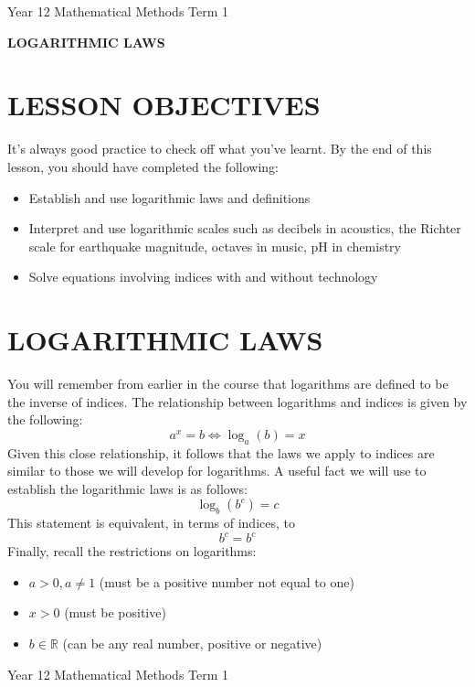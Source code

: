 \documentclass[12pt]{article}
\begin{document}
\noindent Year 12 Mathematical Methods \hfill Term 1
\begin{center}
    \Large\textbf{LOGARITHMIC LAWS}
\end{center}

\section*{LESSON OBJECTIVES}
\noindent It's always good practice to check off what you've learnt. By the end of this lesson, you should have completed the following:
\begin{itemize}
  \item Establish and use logarithmic laws and definitions
  \item Interpret and use logarithmic scales such as decibels in acoustics, the Richter scale for earthquake magnitude, octaves in music, pH in chemistry
  \item Solve equations involving indices with and without technology
\end{itemize}

\section*{LOGARITHMIC LAWS}
\noindent You will remember from earlier in the course that logarithms are defined to be the inverse of indices. The relationship between logarithms and indices is given by the following:
\[
a^x = b \Leftrightarrow \log_a(b) = x
\]
Given this close relationship, it follows that the laws we apply to indices are similar to those we will develop for logarithms. A useful fact we will use to establish the logarithmic laws is as follows:
\[
\log_b(b^c) = c
\]
This statement is equivalent, in terms of indices, to
\[
b^c = b^c
\]
Finally, recall the restrictions on logarithms:
\begin{itemize}
  \item \( a > 0, a \neq 1 \) (must be a positive number not equal to one)
  \item \( x > 0 \) (must be positive)
  \item \( b \in \mathbb{R} \) (can be any real number, positive or negative)
\end{itemize}


\newpage %

\noindent Year 12 Mathematical Methods \hfill Term 1
\end{document}
